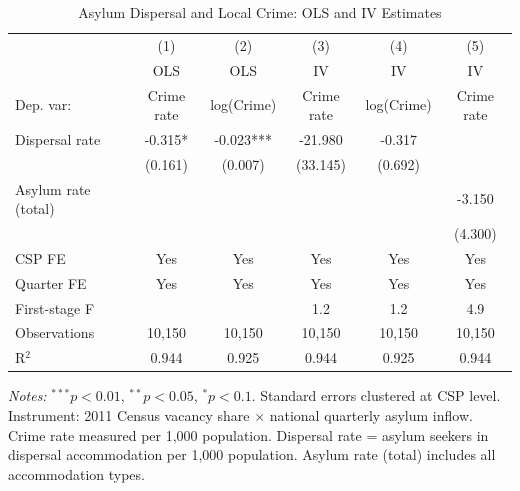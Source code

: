 \begin{table}[t]
\centering
\caption{Asylum Dispersal and Local Crime: OLS and IV Estimates}
\label{tab:main}
\small
\begin{tabular}{lccccc}
\hline\hline
 & (1) & (2) & (3) & (4) & (5) \\
 & OLS & OLS & IV & IV & IV \\
Dep. var: & Crime rate & log(Crime) & Crime rate & log(Crime) & Crime rate \\
\hline
Dispersal rate & -0.315* & -0.023*** & -21.980 & -0.317 &  \\
 & (0.161) & (0.007) & (33.145) & (0.692) &  \\
Asylum rate (total) &  &  &  &  & -3.150 \\
 &  &  &  &  & (4.300) \\
\hline
CSP FE & Yes & Yes & Yes & Yes & Yes \\
Quarter FE & Yes & Yes & Yes & Yes & Yes \\
First-stage F &  &  & 1.2 & 1.2 & 4.9 \\
Observations & 10,150 & 10,150 & 10,150 & 10,150 & 10,150 \\
R$^2$ & 0.944 & 0.925 & 0.944 & 0.925 & 0.944 \\
\hline\hline
\end{tabular}
\begin{tablenotes}\small
\item \textit{Notes:} $^{***}p<0.01$, $^{**}p<0.05$, $^{*}p<0.1$. Standard errors clustered at CSP level. Instrument: 2011 Census vacancy share $\times$ national quarterly asylum inflow. Crime rate measured per 1,000 population. Dispersal rate = asylum seekers in dispersal accommodation per 1,000 population. Asylum rate (total) includes all accommodation types.
\end{tablenotes}
\end{table}
